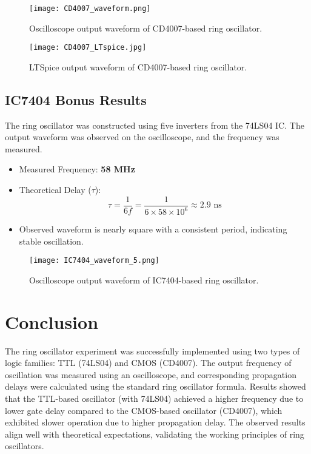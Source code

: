 \documentclass[conference]{IEEEtran}
\begin{document}
\begin{figure}[H]
    \centering
    \texttt{[image: CD4007\_waveform.png]}
    \caption{Oscilloscope output waveform of CD4007-based ring oscillator.}
    \label{fig:cd4007_waveform}
\end{figure}

\begin{figure}[H]
    \centering
    \texttt{[image: CD4007\_LTspice.jpg]}
    \caption{LTSpice output waveform of CD4007-based ring oscillator.}
    \label{fig:cd4007_waveform}
\end{figure}

\subsection{IC7404 Bonus Results}
\noindent The ring oscillator was constructed using five inverters from the 74LS04 IC. The output waveform was observed on the oscilloscope, and the frequency was measured.

\begin{itemize}
    \item Measured Frequency: \textbf{58 MHz}
    \item Theoretical Delay ($\tau$): 
    \begin{equation}
        \tau = \frac{1}{6f} = \frac{1}{6 \times 58 \times 10^6} \approx 2.9 \text{ ns}
    \end{equation}
    \item Observed waveform is nearly square with a consistent period, indicating stable oscillation.
\end{itemize}

\begin{figure}[H]
    \centering
    \texttt{[image: IC7404\_waveform\_5.png]}
    \caption{Oscilloscope output waveform of IC7404-based ring oscillator.}
    \label{fig:ic7404_waveform}
\end{figure}

\section{Conclusion}
\noindent The ring oscillator experiment was successfully implemented using two types of logic families: TTL (74LS04) and CMOS (CD4007). The output frequency of oscillation was measured using an oscilloscope, and corresponding propagation delays were calculated using the standard ring oscillator formula. Results showed that the TTL-based oscillator (with 74LS04) achieved a higher frequency due to lower gate delay compared to the CMOS-based oscillator (CD4007), which exhibited slower operation due to higher propagation delay. The observed results align well with theoretical expectations, validating the working principles of ring oscillators.
\end{document}
